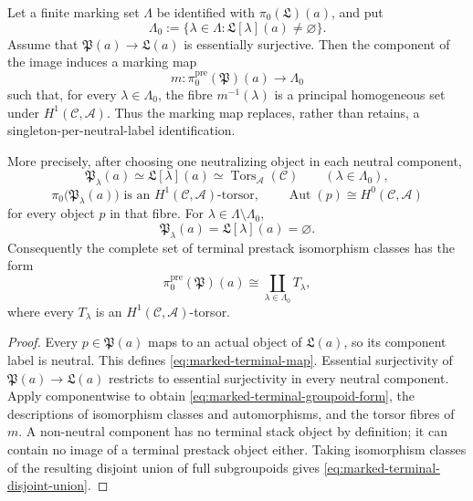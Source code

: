 \begin{theorem}
\label{thm:marked-terminal-torsor-form}
Let a finite marking set \(\Lambda\) be identified with
\(\pi_0(\mathfrak L)(a)\), and put
\[
 \Lambda_0
 :=\{\lambda\in\Lambda:\mathfrak L[\lambda](a)\ne\varnothing\}.
\]
Assume that \(\mathfrak P(a)\to\mathfrak L(a)\) is essentially
surjective.  Then the component of the image induces a marking map
\begin{equation}\label{eq:marked-terminal-map}
 m:\pi_0^{\mathrm{pre}}(\mathfrak P)(a)\longrightarrow\Lambda_0
\end{equation}
such that, for every \(\lambda\in\Lambda_0\), the fibre
\(m^{-1}(\lambda)\) is a principal homogeneous set under
\(H^1(\mathcal C,\mathscr A)\).  Thus the marking map replaces, rather than
retains, a singleton-per-neutral-label identification.

More precisely, after choosing one neutralizing object in each neutral
component,
\begin{equation}\label{eq:marked-terminal-groupoid-form}
 \mathfrak P_\lambda(a)
 \simeq \mathfrak L[\lambda](a)
 \simeq \operatorname{Tors}_{\mathscr A}(\mathcal C)
 \qquad(\lambda\in\Lambda_0),
\end{equation}
\[
 \pi_0\bigl(\mathfrak P_\lambda(a)\bigr)
 \text{ is an }H^1(\mathcal C,\mathscr A)\text{-torsor},
 \qquad
 \operatorname{Aut}(p)\cong H^0(\mathcal C,\mathscr A)
\]
for every object \(p\) in that fibre.  For
\(\lambda\in\Lambda\setminus\Lambda_0\),
\[
 \mathfrak P_\lambda(a)=\mathfrak L[\lambda](a)=\varnothing.
\]
Consequently the complete set of terminal prestack isomorphism classes has
the form
\begin{equation}\label{eq:marked-terminal-disjoint-union}
 \pi_0^{\mathrm{pre}}(\mathfrak P)(a)
 \cong\coprod_{\lambda\in\Lambda_0}T_\lambda,
\end{equation}
where every \(T_\lambda\) is an
\(H^1(\mathcal C,\mathscr A)\)-torsor.
\end{theorem}

\begin{proof}
Every \(p\in\mathfrak P(a)\) maps to an actual object of
\(\mathfrak L(a)\), so its component label is neutral.  This defines
\eqref{eq:marked-terminal-map}.  Essential surjectivity of
\(\mathfrak P(a)\to\mathfrak L(a)\) restricts to essential surjectivity in
every neutral component.  Apply
 componentwise to obtain
\eqref{eq:marked-terminal-groupoid-form}, the descriptions of isomorphism
classes and automorphisms, and the torsor fibres of \(m\).  A non-neutral
component has no terminal stack object by definition; it can contain no
image of a terminal prestack object either.  Taking isomorphism classes of
the resulting disjoint union of full subgroupoids gives
\eqref{eq:marked-terminal-disjoint-union}.
\end{proof}

